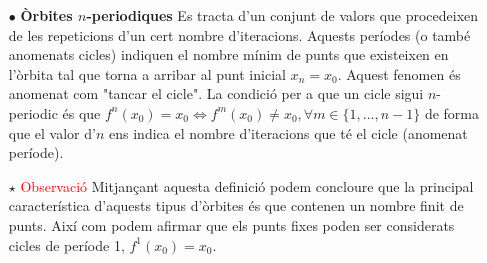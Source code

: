 \documentclass[12pt]{report}
\begin{document}
\begin{itemize}
    \item [$\bullet$] \textbf{Òrbites $n$-periodiques}
    \newline
    Es tracta d'un conjunt de valors que procedeixen de les repeticions d'un cert nombre d'iteracions. Aquests períodes (o també anomenats cicles) indiquen el nombre mínim de punts que existeixen en l'òrbita tal que torna a arribar al punt inicial $x_n=x_0$. Aquest fenomen és anomenat com "tancar el cicle". La condició per a que un cicle sigui $n$-periodic és que $f^n(x_0)=x_0 \Leftrightarrow f^m(x_0) \neq x_0, \forall m \in \{1,...,n-1\}$ de forma que el valor d'$n$ ens indica el nombre d'iteracions que té el cicle (anomenat període).
\end{itemize}
 \begin{itemize}
    \item [$\star$] \textcolor{red}{Observació}
    \newline
  Mitjançant aquesta definició podem concloure que la principal característica d'aquests tipus d'òrbites és que contenen un nombre finit de punts. Així com podem afirmar que els punts fixes poden ser considerats cicles de període 1, $f^1(x_0)=x_0$.
   \newline
   \newline
\end{itemize}
\end{document}
